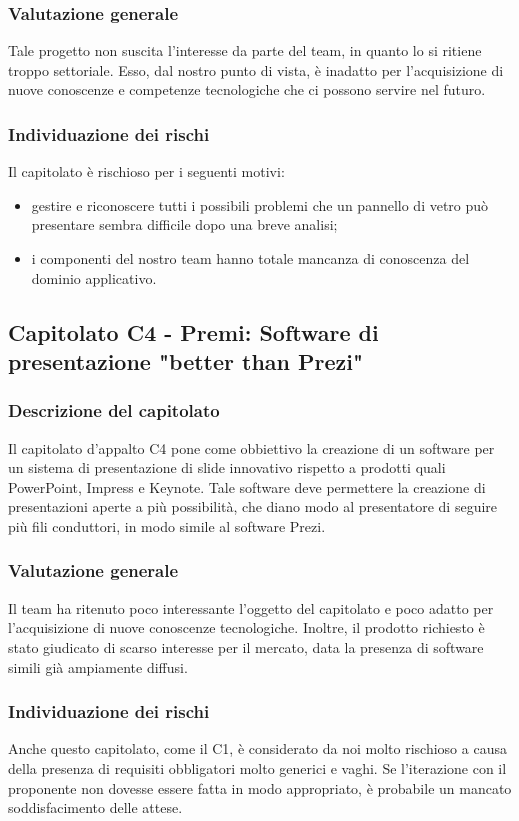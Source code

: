 		\subsubsection{Valutazione generale}
			Tale progetto non suscita l'interesse da parte del team, in quanto lo si ritiene troppo settoriale. Esso, dal nostro punto di vista, è inadatto per l'acquisizione di nuove conoscenze e competenze tecnologiche che ci possono servire nel futuro.
		\subsubsection{Individuazione dei rischi}
			Il capitolato è rischioso per i seguenti motivi:
			\begin{itemize}
				\item gestire e riconoscere tutti i possibili problemi che un pannello di vetro può presentare sembra difficile dopo una breve analisi;
				\item i componenti del nostro team hanno totale mancanza di conoscenza del dominio applicativo.
			\end{itemize}
	\subsection{Capitolato C4 - Premi: Software di presentazione "better than Prezi"}
		\subsubsection{Descrizione del capitolato}
			Il capitolato d'appalto C4 pone come obbiettivo la creazione di un software per un sistema di presentazione di slide innovativo rispetto a prodotti quali PowerPoint, Impress e Keynote. Tale software deve permettere la creazione di presentazioni aperte a più possibilità, che diano modo al presentatore di seguire più fili conduttori, in modo simile al software Prezi.
		\subsubsection{Valutazione generale}
			Il team ha ritenuto poco interessante l'oggetto del capitolato e poco adatto per l'acquisizione di nuove conoscenze tecnologiche. Inoltre, il prodotto richiesto è stato giudicato di scarso interesse per il mercato, data la presenza di software simili già ampiamente diffusi.
		\subsubsection{Individuazione dei rischi}
			Anche questo capitolato, come il C1, è considerato da noi molto rischioso a causa della presenza di requisiti obbligatori molto generici e vaghi. Se l'iterazione con il proponente non dovesse essere fatta in modo appropriato, è probabile un mancato soddisfacimento delle attese.
